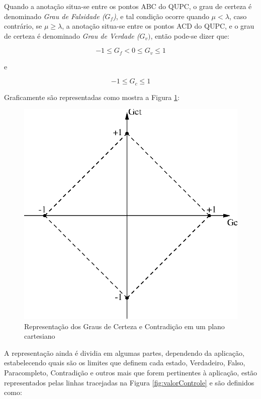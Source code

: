 Quando a anotação situa-se entre os pontos ABC do QUPC, o grau de certeza é denominado \emph{Grau de Falsidade ($G _f$)}, e tal condição ocorre quando $\mu < \lambda $, caso contrário, se $\mu \ge \lambda $, a anotação situa-se entre os pontos ACD do QUPC, e o grau de certeza é denominado \emph{Grau de Verdade ($G _v)$}, então pode-se dizer que:
\begin{center}
\begin{equation}
-1 \le G _{f}  <  0 \le G _{v} \le 1
\label{eq:grauVerdadeFalsidade}
\end{equation}
\end{center}
e
\begin{center}
\begin{equation}
-1 \le G _{c} \le 1
\label{eq:grauCertezaIntervalo}
\end{equation}
\end{center}

Graficamente são representadas como mostra a Figura \ref{fig:retasgcgct}:

\begin{figure}[!htb]
\center\includegraphics[scale=1.0]{./pic/C428retasgcgct.eps}
\caption{Representação dos Graus de Certeza e Contradição em um plano cartesiano}
\label{fig:retasgcgct}
\end{figure}

A representação ainda é dividia em algumas partes, dependendo da aplicação, estabelecendo quais são os limites que definem cada estado, Verdadeiro, Falso, Paracompleto, Contradição e outros mais que forem pertinentes à aplicação, estão representados pelas linhas tracejadas na Figura \ref{fig:valorControle} e são definidos como:

